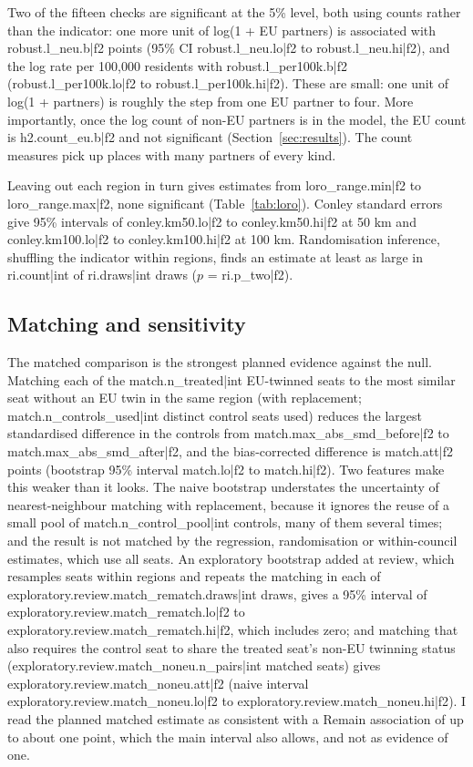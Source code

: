 \documentclass[11pt,a4paper]{article}
\begin{document}
Two of the fifteen checks are significant at the 5\% level, both using counts rather than the indicator: one more unit of log(1 + EU partners) is associated with {{robust.l_neu.b|f2}} points (95\% CI {{robust.l_neu.lo|f2}} to {{robust.l_neu.hi|f2}}), and the log rate per 100,000 residents with {{robust.l_per100k.b|f2}} ({{robust.l_per100k.lo|f2}} to {{robust.l_per100k.hi|f2}}). These are small: one unit of log(1 + partners) is roughly the step from one EU partner to four. More importantly, once the log count of non-EU partners is in the model, the EU count is {{h2.count_eu.b|f2}} and not significant (Section~\ref{sec:results}). The count measures pick up places with many partners of every kind.

Leaving out each region in turn gives estimates from {{loro_range.min|f2}} to {{loro_range.max|f2}}, none significant (Table~\ref{tab:loro}). Conley standard errors give 95\% intervals of {{conley.km50.lo|f2}} to {{conley.km50.hi|f2}} at 50 km and {{conley.km100.lo|f2}} to {{conley.km100.hi|f2}} at 100 km. Randomisation inference, shuffling the indicator within regions, finds an estimate at least as large in {{ri.count|int}} of {{ri.draws|int}} draws ($p$ = {{ri.p_two|f2}}).

\subsection{Matching and sensitivity}
The matched comparison is the strongest planned evidence against the null. Matching each of the {{match.n_treated|int}} EU-twinned seats to the most similar seat without an EU twin in the same region (with replacement; {{match.n_controls_used|int}} distinct control seats used) reduces the largest standardised difference in the controls from {{match.max_abs_smd_before|f2}} to {{match.max_abs_smd_after|f2}}, and the bias-corrected difference is {{match.att|f2}} points (bootstrap 95\% interval {{match.lo|f2}} to {{match.hi|f2}}). Two features make this weaker than it looks. The naive bootstrap understates the uncertainty of nearest-neighbour matching with replacement, because it ignores the reuse of a small pool of {{match.n_control_pool|int}} controls, many of them several times; and the result is not matched by the regression, randomisation or within-council estimates, which use all seats. An exploratory bootstrap added at review, which resamples seats within regions and repeats the matching in each of {{exploratory.review.match_rematch.draws|int}} draws, gives a 95\% interval of {{exploratory.review.match_rematch.lo|f2}} to {{exploratory.review.match_rematch.hi|f2}}, which includes zero; and matching that also requires the control seat to share the treated seat's non-EU twinning status ({{exploratory.review.match_noneu.n_pairs|int}} matched seats) gives {{exploratory.review.match_noneu.att|f2}} (naive interval {{exploratory.review.match_noneu.lo|f2}} to {{exploratory.review.match_noneu.hi|f2}}). I read the planned matched estimate as consistent with a Remain association of up to about one point, which the main interval also allows, and not as evidence of one.
\end{document}
